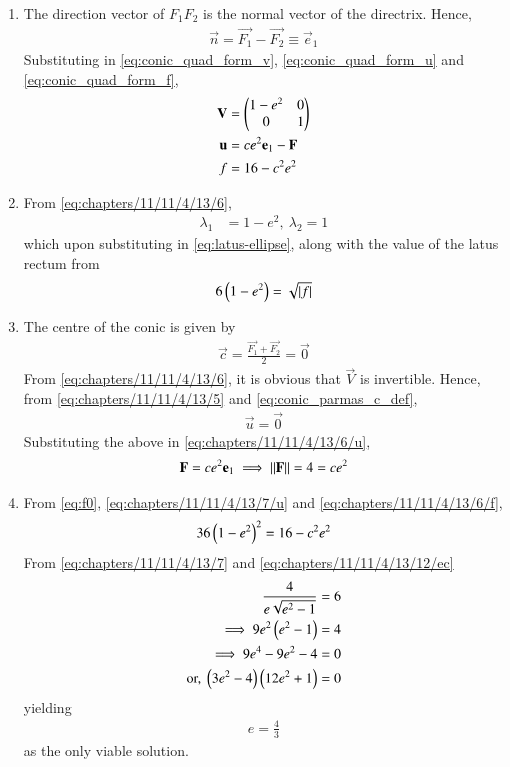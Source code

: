 \begin{enumerate}
\item The direction vector of $F_1F_2$ is the normal vector of the directrix.  Hence, 
\begin{align}
\vec{n} = \vec{F_1} - \vec{F_2}
	\equiv \vec{e}_1
\end{align}
Substituting in 
  \eqref{eq:conic_quad_form_v},
\eqref{eq:conic_quad_form_u}
and
\eqref{eq:conic_quad_form_f},
\begin{align}
	\boldsymbol{\mathbf{V}} &= \begin{pmatrix}1-e^2&0\\0&1\end{pmatrix} \label{eq:chapters/11/11/4/13/6} 
	\\
	\boldsymbol{\mathbf{u}} &= ce^2\boldsymbol{\mathbf{e}}_1-\boldsymbol{\mathbf{F}}
\label{eq:chapters/11/11/4/13/6/u} 
	\\
	f&=16-c^2e^2
\label{eq:chapters/11/11/4/13/6/f} 
\end{align}
\item From
\eqref{eq:chapters/11/11/4/13/6},
\begin{align}
\lambda_1 &= 1-e^2,\
\lambda_2 = 1
\label{eq:chapters/11/11/4/13/12}
\end{align}
which upon substituting
in
			\eqref{eq:latus-ellipse}, along with the value of the latus rectum 
from \tabref{tab:chapters/11/11/4/13/1}
		\begin{align}
	6\left(1-e^2\right) = \sqrt{\left\vert f\right\vert}
\label{eq:chapters/11/11/4/13/12/f}
\end{align}
\item  The centre of the conic is given by
\begin{align}
\vec{c} = \frac{\vec{F_1} + \vec{F_2}}{2}
= \vec{0}
\label{eq:chapters/11/11/4/13/5}
\end{align}
From \eqref{eq:chapters/11/11/4/13/6}, it is obvious that  
$\vec{V}$ is invertible.  Hence,  
from \eqref{eq:chapters/11/11/4/13/5}
and 
\eqref{eq:conic_parmas_c_def},
\begin{align}
\vec{u} = \vec{0}
	\label{eq:chapters/11/11/4/13/7/u}
\end{align}
Substituting the above in \eqref{eq:chapters/11/11/4/13/6/u}, 
\begin{align}
\boldsymbol{\mathbf{F}} = ce^2\boldsymbol{\mathbf{e}}_1 
\implies 
	\lVert\boldsymbol{\mathbf{F}}\rVert = 4 = ce^2
	\label{eq:chapters/11/11/4/13/7}
\end{align}
\item 
	From 
      \eqref{eq:f0}, 
	\eqref{eq:chapters/11/11/4/13/7/u}
and
\eqref{eq:chapters/11/11/4/13/6/f},
		\begin{align}
	36\left(1-e^2\right)^2 = 16-c^2e^2
\label{eq:chapters/11/11/4/13/12/ec}
\end{align}
From
	\eqref{eq:chapters/11/11/4/13/7}
	and
\eqref{eq:chapters/11/11/4/13/12/ec}
\begin{align}
\frac{4}{e\sqrt{e^2-1}} &= 6
\\
\implies 9e^2\left(e^2-1\right) &= 4\\
\implies 9e^4-9e^2-4 &= 0
\\
	\text{or, }\left(3e^2-4\right)
	\left(12e^2+1\right) &=0
\label{eq:chapters/11/11/4/13/14}
\end{align}
yielding
\begin{align}
e = \frac{4}{3}
\end{align}
as the only viable solution.
\end{enumerate}
